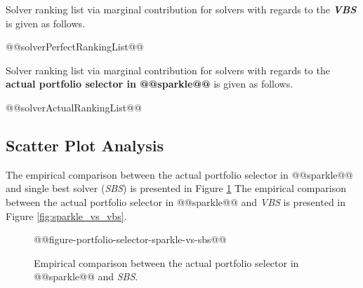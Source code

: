 \documentclass[british]{article}
\begin{document}
Solver ranking list via marginal contribution \cite{XuEtAl12} for solvers with regards to the \textbf{{\em VBS}} is given as follows.

\begin{enumerate} 
@@solverPerfectRankingList@@
\end{enumerate}

Solver ranking list via marginal contribution \cite{XuEtAl12} for solvers with regards to the \textbf{actual portfolio selector in @@sparkle@@} is given as follows.

\begin{enumerate} 
@@solverActualRankingList@@
\end{enumerate}


\subsection{Scatter Plot Analysis}

The empirical comparison between the actual portfolio selector in @@sparkle@@ and single best solver (\emph{SBS}) is presented in Figure \ref{fig:sparkle_vs_sbs}
The empirical comparison between the actual portfolio selector in @@sparkle@@ and \emph{VBS} is presented in Figure \ref{fig:sparkle_vs_vbs}.


%

\begin{figure}[htbp]
\noindent \begin{centering}
@@figure-portfolio-selector-sparkle-vs-sbs@@
\par\end{centering}

\caption{Empirical comparison between the actual portfolio selector in @@sparkle@@ and \emph{SBS}.}\label{fig:sparkle_vs_sbs}
\end{figure}
\end{document}
